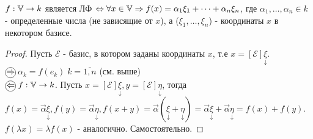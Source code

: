 \documentclass[../main.tex]{subfiles}
\begin{document}
\newpage
{}
\begin{theorem}
    $f: \mathbb{V} \to k$ является ЛФ $\Leftrightarrow \forall x \in \mathbb{V} \Rightarrow f(x)=\alpha_{1}\xi_{1} + \dots+ \alpha_{n}\xi_{n}$, где $\alpha_{1},\dots,\alpha_{n}\in k $ - определенные числа (не зависящие от $x$), а ($\xi_{1},\dots,\xi_{n}$) - координаты $x$ в некотором базисе. 
\end{theorem}
\begin{proof}
    Пусть $\mathcal{E}$ - базис, в котором заданы координаты $x$, т.е $x = [\mathcal{E}]\underset{\downarrow}{\xi}$. 
    \\$\tcircle{$\implies$}$ $\alpha_{k}=f(e_{k})\; k=\overline{1,n}$ (см. выше)
    \\$\tcircle{$\impliedby$}$ $f: \mathbb{V} \to k$. Пусть $x=[\mathcal{E}]\underset{\downarrow}{\xi}, y = [\mathcal{E}]\underset{\downarrow}{\eta}$, тогда $f(x) = \vec{\alpha}\underset{\downarrow}{\xi}, f(y) = \vec{\alpha}\underset{\downarrow}{\eta}, f(x+y) = \vec{\alpha}(\underset{\downarrow}{\xi} + \underset{\downarrow}{\eta}) = \vec{\alpha}\underset{\downarrow}{\xi}+\vec{\alpha}\underset{\downarrow}{\eta}=f(x)+f(y)$.
    \\$f(\lambda x )= \lambda f(x)$ - аналогично. Самостоятельно. 
\end{proof}
\end{document}
